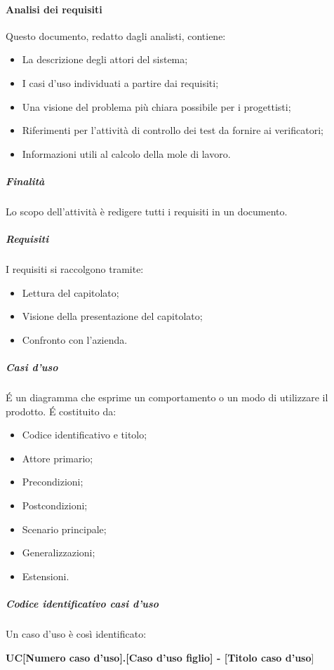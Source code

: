 \paragraph{Analisi dei requisiti}
Questo documento, redatto dagli analisti, contiene:
\begin{itemize}
\item La descrizione degli attori del sistema;
\item I casi d'uso individuati a partire dai requisiti;
\item Una visione del problema più chiara possibile per i progettisti;
\item Riferimenti per l'attività di controllo dei test da fornire ai verificatori;
\item Informazioni utili al calcolo della mole di lavoro.
\end{itemize}
\subparagraph{Finalità}
Lo scopo dell'attività è redigere tutti i requisiti in un documento.
\subparagraph{Requisiti}
I requisiti si raccolgono tramite:
\begin{itemize}
\item Lettura del capitolato;
\item Visione della presentazione del capitolato;
\item Confronto con l'azienda.
\end{itemize}
\subparagraph{Casi d'uso}
\'E un diagramma che esprime un comportamento o un modo di utilizzare il prodotto. \'E costituito da:
\begin{itemize}
\item Codice identificativo e titolo;
\item Attore primario;
\item Precondizioni;
\item Postcondizioni;
\item Scenario principale;
\item Generalizzazioni;
\item Estensioni.
\end{itemize}
\subparagraph{Codice identificativo casi d'uso}
Un caso d'uso è così identificato:

\begin{center}
\textbf{UC[Numero caso d'uso].[Caso d'uso figlio] - [Titolo caso d'uso}]
\end{center}
		
